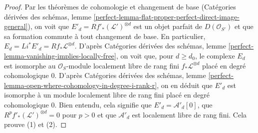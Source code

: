 \begin{proof}
\medskip\noindent
Par les théorèmes de cohomologie et changement de base
(Catégories dérivées des schémas,
lemme \ref{perfect-lemma-flat-proper-perfect-direct-image-general}),
on voit que $E'_d = Rf'_*(\mathcal{L}')^{\otimes d}$
est un objet parfait de $D(\mathcal{O}_{S'})$
et que sa formation commute à tout changement de base.
En particulier, $E_d = Li^*E'_d = Rf_*\mathcal{L}^{\otimes d}$.
D'après Catégories dérivées des schémas, lemme
\ref{perfect-lemma-vanishing-implies-locally-free},
on voit que, pour $d \geq d_0$, le complexe $E_d$ est isomorphe au
$\mathcal{O}_S$-module localement libre de rang fini
$f_*\mathcal{L}^{\otimes d}$ placé
en degré cohomologique $0$. D'après
Catégories dérivées des schémas, lemme
\ref{perfect-lemma-open-where-cohomology-in-degree-i-rank-r},
on en déduit que $E'_d$ est isomorphe à un module localement libre de rang fini
placé en degré cohomologique $0$.
Bien entendu, cela signifie que $E'_d = \mathcal{A}'_d[0]$,
que $R^pf'_*(\mathcal{L}')^{\otimes d} = 0$ pour $p > 0$
et que $\mathcal{A}'_d$ est localement libre de rang fini.
Cela prouve (1) et (2).


\end{proof}
